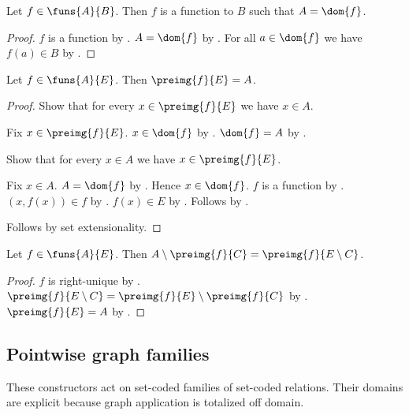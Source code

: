 \begin{proposition}\label{funs_elim}
    Let $f\in\funs{A}{B}$.
    Then $f$ is a function to $B$ such that $A= \dom{f}$.
\end{proposition}
\begin{proof}
    $f$ is a function by .
    $A = \dom{f}$ by .
    For all $a\in\dom{f}$ we have $f(a)\in B$
        by .
\end{proof}

\begin{proposition}\label{preimg_codom_of_function}
    Let $f\in\funs{A}{E}$.
    Then $\preimg{f}{E}=A$.
\end{proposition}
\begin{proof}
    Show that for every $x\in\preimg{f}{E}$ we have $x\in A$.
    \begin{subproof}
        Fix $x\in\preimg{f}{E}$.
        $x\in\dom{f}$ by .
        $\dom{f}=A$ by .
    \end{subproof}
    Show that for every $x\in A$ we have $x\in\preimg{f}{E}$.
    \begin{subproof}
        Fix $x\in A$.
        $A=\dom{f}$ by .
        Hence $x\in\dom{f}$.
        $f$ is a function by .
        $(x,f(x))\in f$ by .
        $f(x)\in E$ by .
        Follows by .
    \end{subproof}
    Follows by set extensionality.
\end{proof}

\begin{proposition}\label{preimg_relative_complement_of_function}
    Let $f\in\funs{A}{E}$.
    Then
        $A\setminus\preimg{f}{C}
            =\preimg{f}{E\setminus C}$.
\end{proposition}
\begin{proof}
    $f$ is right-unique by .
    $\preimg{f}{E\setminus C}
        =\preimg{f}{E}\setminus\preimg{f}{C}$
        by .
    $\preimg{f}{E}=A$ by .
\end{proof}

\subsection{Pointwise graph families}

These constructors act on set-coded families of set-coded relations.  Their
domains are explicit because graph application is totalized off domain.

